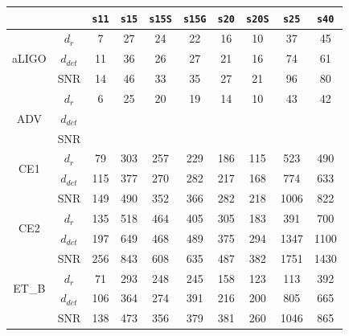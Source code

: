 \begin{table}
  \centering
  \begin{tabular}{c|c|cccccccc}







    
    
\multicolumn{2}{c|}{}  & \texttt{s11} & \texttt{s15} & \texttt{s15S} & \texttt{s15G} & \texttt{s20} & \texttt{s20S} & \texttt{s25}  & \texttt{s40}\\   

\hline
\multirow{3}{*}{aLIGO} & $d_{r}$ & 7   & 27  & 24  & 22  & 16  & 10  & 37  & 45 \\
\cline{2-10}
                       & $d_{det}$ & 11 & 36 & 26 & 27 & 21 & 16 & 74 & 61\\
                       & SNR      & 14 & 46 & 33 & 35 & 27 & 21 & 96 & 80\\

\hline
\hline
\multirow{3}{*}{ADV}   & $d_{r}$ & 6   & 25  & 20  & 19  & 14  & 10  & 43  & 42 \\
\cline{2-10}
                       & $d_{det}$ &  &  &  &  &  &  &  & \\
                       & SNR      &  &  &  &  &  &  &  & \\

\hline
\hline
\multirow{2}{*}{CE1}   & $d_{r}$   & 79  & 303 & 257 & 229 & 186 & 115 & 523 & 490 \\
\cline{2-10}
                       & $d_{det}$ & 115 & 377 & 270 & 282 & 217 & 168 & 774  & 633\\
                       & SNR      & 149 & 490 & 352 & 366 & 282 & 218 & 1006 & 822\\

\hline
\multirow{2}{*}{CE2}   & $d_{r}$  & 135 & 518 & 464 & 405 & 305 & 183 & 391 & 700 \\
\cline{2-10}
                       & $d_{det}$ & 197 & 649 & 468 & 489 & 375 & 294 & 1347  & 1100\\
                       & SNR    & 256 & 843 & 608 & 635 & 487 & 382 & 1751 & 1430\\

\hline
\multirow{2}{*}{ET\_B} & $d_{r}$ & 71  & 293 & 248 & 245 & 158 & 123 & 113 & 392 \\
\cline{2-10}
                       & $d_{det}$ & 106 & 364 & 274 & 391 & 216 & 200 & 805 & 665\\
                       & SNR      & 138 & 473 & 356 & 379 & 381 & 260 & 1046 & 865\\


\end{tabular}
\end{table}
